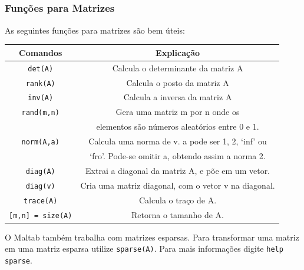 \documentclass{beamer}
\begin{document}
\subsection[Fun\c{c}\~oes para Matrizes]{}
\begin{frame}
\frametitle{Fun\c{c}\~oes para Matrizes}

As seguintes fun\c{c}\~oes para matrizes s\~ao bem \'uteis:
{\scriptsize
\begin{center}
\begin{tabular}{|c|c|}
\hline
Comandos & Explica\c{c}\~ao \\ \hline
{\tt det(A)} & Calcula o determinante da matriz A \\ \hline
{\tt rank(A)} & Calcula o posto da matriz A \\ \hline
{\tt inv(A)} & Calcula a inversa da matriz A \\ \hline
{\tt rand(m,n)} & Gera uma matriz m por n onde os \\
& elementos s\~ao n\'umeros aleat\'orios entre 0 e 1. \\ \hline
{\tt norm(A,a)} & Calcula uma norma de v. a pode ser 1, 2, `inf' ou \\
& `fro'. Pode-se omitir a, obtendo assim a norma 2. \\ \hline
{\tt diag(A)} & Extrai a diagonal da matriz A, e p\~oe em um vetor. \\ \hline
{\tt diag(v)} & Cria uma matriz diagonal, com o vetor v na diagonal. \\ \hline
{\tt trace(A)} & Calcula o tra\c{c}o de A. \\ \hline
{\tt [m,n] = size(A)} & Retorna o tamanho de A. \\ \hline

\end{tabular}
\end{center}}

\pause

O Maltab tamb\'em trabalha com matrizes esparsas. Para transformar uma matriz em uma matriz esparsa utilize {\tt sparse(A)}. Para mais informa\c{c}\~oes digite {\tt help sparse}.

\end{frame}

\section[Exerc\'icios]{}
\end{document}
